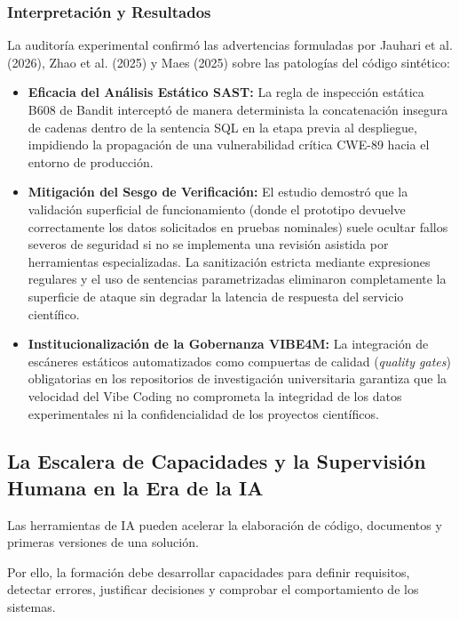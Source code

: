 \subsubsection*{Interpretación y Resultados}
La auditoría experimental confirmó las advertencias formuladas por Jauhari et al. (2026), Zhao et al. (2025) y Maes (2025) sobre las patologías del código sintético:
\begin{itemize}
    \item \textbf{Eficacia del Análisis Estático SAST:} La regla de inspección estática B608 de Bandit interceptó de manera determinista la concatenación insegura de cadenas dentro de la sentencia SQL en la etapa previa al despliegue, impidiendo la propagación de una vulnerabilidad crítica CWE-89 hacia el entorno de producción.
    \item \textbf{Mitigación del Sesgo de Verificación:} El estudio demostró que la validación superficial de funcionamiento (donde el prototipo devuelve correctamente los datos solicitados en pruebas nominales) suele ocultar fallos severos de seguridad si no se implementa una revisión asistida por herramientas especializadas. La sanitización estricta mediante expresiones regulares y el uso de sentencias parametrizadas eliminaron completamente la superficie de ataque sin degradar la latencia de respuesta del servicio científico.
    \item \textbf{Institucionalización de la Gobernanza VIBE4M:} La integración de escáneres estáticos automatizados como compuertas de calidad (\textit{quality gates}) obligatorias en los repositorios de investigación universitaria garantiza que la velocidad del Vibe Coding no comprometa la integridad de los datos experimentales ni la confidencialidad de los proyectos científicos.
\end{itemize}
\subsection{La Escalera de Capacidades y la Supervisión Humana en la Era de la IA}

Las herramientas de IA pueden acelerar la elaboración de código, documentos y primeras versiones de una solución. %

Por ello, la formación debe desarrollar capacidades para definir requisitos, detectar errores, justificar decisiones y comprobar el comportamiento de los sistemas. %

